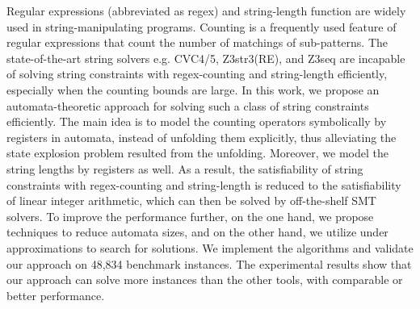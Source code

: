
%

Regular expressions (abbreviated as regex) and string-length function are widely used in string-manipulating programs. 
Counting is a frequently used feature of regular expressions that count the number of matchings of sub-patterns. The state-of-the-art string solvers e.g. CVC4/5, Z3str3(RE), and Z3seq are incapable of solving string constraints with regex-counting and string-length efficiently, especially when the counting bounds are large. In this work, we propose an automata-theoretic approach for solving such a class of string constraints efficiently. 
%
The main idea is to model the counting operators symbolically by registers in automata, instead of unfolding them explicitly, thus alleviating the state explosion problem resulted from the unfolding.  
%
Moreover, we model the string lengths by registers as well. 
As a result, the satisfiability of string constraints with regex-counting and string-length is reduced to the satisfiability of linear integer arithmetic, which can then be solved by off-the-shelf SMT solvers. 
%
%
To improve the performance further, on the one hand, we propose techniques to reduce automata sizes, 
and on the other hand, we utilize under approximations to search for solutions.   
We implement the algorithms and validate our approach on 48,834 benchmark instances. The experimental results show that 
our approach can solve more instances than the other tools, with comparable or better performance.



%